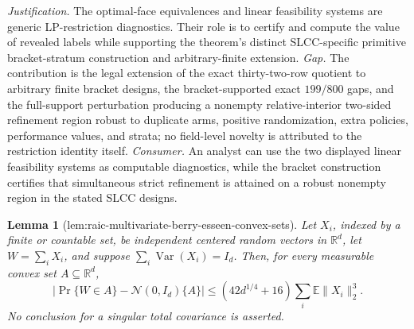 \documentclass{article}
\newtheorem{lemma}{Lemma}
\begin{document}
\par\smallskip\noindent \textit{Justification.} The optimal-face equivalences and linear feasibility systems are generic LP-restriction diagnostics. Their role is to certify and compute the value of revealed labels while supporting the theorem's distinct SLCC-specific primitive bracket-stratum construction and arbitrary-finite extension. \textit{Gap.} The contribution is the legal extension of the exact thirty-two-row quotient to arbitrary finite bracket designs, the bracket-supported exact \(199/800\) gaps, and the full-support perturbation producing a nonempty relative-interior two-sided refinement region robust to duplicate arms, positive randomization, extra policies, performance values, and strata; no field-level novelty is attributed to the restriction identity itself. \textit{Consumer.} An analyst can use the two displayed linear feasibility systems as computable diagnostics, while the bracket construction certifies that simultaneous strict refinement is attained on a robust nonempty region in the stated SLCC designs.

\begin{lemma}[lem:raic-multivariate-berry-esseen-convex-sets]\label{lem:raic-multivariate-berry-esseen-convex-sets}
Let \(X_i\), indexed by a finite or countable set, be independent centered random vectors in \(\mathbb R^d\), let \(W=\sum_iX_i\), and suppose \(\sum_i\operatorname{Var}(X_i)=I_d\).  Then, for every measurable convex set \(A\subseteq\mathbb R^d\), \[\left|\Pr\{W\in A\}-\mathcal N(0,I_d)\{A\}\right|\leq(42d^{1/4}+16)\sum_i\mathbb E\|X_i\|_2^3.\] No conclusion for a singular total covariance is asserted.
\end{lemma}
\end{document}

